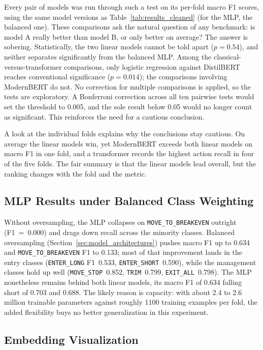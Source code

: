Every pair of models was run through such a test on its per-fold macro F1 scores, using the same model versions as Table~\ref{tab:results_cleaned} (for the MLP, the balanced one). These comparisons ask the natural question of any benchmark: is model A really better than model B, or only better on average? The answer is sobering. Statistically, the two linear models cannot be told apart ($p = 0.54$), and neither separates significantly from the balanced MLP. Among the classical-versus-transformer comparisons, only logistic regression against DistilBERT reaches conventional significance ($p = 0.014$); the comparisons involving ModernBERT do not. No correction for multiple comparisons is applied, so the tests are exploratory. A Bonferroni correction across all ten pairwise tests would set the threshold to 0.005, and the sole result below 0.05 would no longer count as significant. This reinforces the need for a cautious conclusion.

A look at the individual folds explains why the conclusions stay cautious. On average the linear models win, yet ModernBERT exceeds both linear models on macro F1 in one fold, and a transformer records the highest action recall in four of the five folds. The fair summary is that the linear models lead overall, but the ranking changes with the fold and the metric.

\subsection{MLP Results under Balanced Class Weighting}
\label{sec:mlp_balanced}

Without oversampling, the MLP collapses on \texttt{MOVE\_TO\_BREAKEVEN} outright (F1~=~0.000) and drags down recall across the minority classes. Balanced oversampling (Section~\ref{sec:model_architectures}) pushes macro F1 up to 0.634 and \texttt{MOVE\_TO\_BREAKEVEN} F1 to 0.133; most of that improvement lands in the entry classes (\texttt{ENTER\_LONG} F1~0.533, \texttt{ENTER\_SHORT}~0.590), while the management classes hold up well (\texttt{MOVE\_STOP}~0.852, \texttt{TRIM}~0.799, \texttt{EXIT\_ALL}~0.798). The MLP nonetheless remains behind both linear models, its macro F1 of 0.634 falling short of 0.703 and 0.688. The likely reason is capacity: with about 2.4 to 2.6 million trainable parameters against roughly 1100 training examples per fold, the added flexibility buys no better generalization in this experiment.

\subsection{Embedding Visualization}
\label{sec:embedding_visualization}

